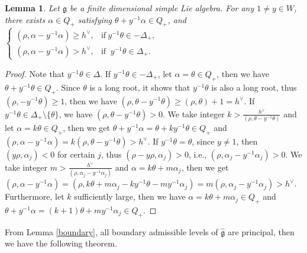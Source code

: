 \documentclass[12pt]{article}
\newtheorem{lem}[thm]{Lemma}
\begin{document}
\begin{lem}\label{lemy1}
Let $\mathfrak{g}$ be a finite dimensional simple Lie algebra. For any $1\ne y\in W$, there exists $\alpha\in Q_+$ satisfying $\theta+y^{-1}\alpha\in Q_+$,
and
$\begin{cases}
  (\rho,\alpha-y^{-1}\alpha)\geq h^\vee, & \text{if}~y^{-1}\theta\in -\Delta_+,\\
  (\rho,\alpha-y^{-1}\alpha)> h^\vee,  & \text{if }~y^{-1}\theta\in \Delta_+.
\end{cases}$
\end{lem}
\begin{proof}
Note that $y^{-1}\theta\in \Delta$.
If $y^{-1}\theta\in -\Delta_+$, let $\alpha=\theta\in Q_+$,
then we have $\theta+y^{-1}\theta\in Q_+$.
Since $\theta$ is a long root, it shows that $y^{-1}\theta$ is also a long root, thus $(\rho,-y^{-1}\theta)\geq1$, then we have
$(\rho,\theta-y^{-1}\theta)\geq(\rho,\theta)+1=h^\vee$.
If $y^{-1}\theta\in \Delta_+\setminus\{\theta\}$,
we have $(\rho,\theta-y^{-1}\theta)>0$.
We take integer $k>\frac{h^\vee}{(\rho,\theta-y^{-1}\theta)}$ and let $\alpha=k\theta\in Q_+$,
then we get $\theta+y^{-1}\alpha=\theta+ky^{-1}\theta\in Q_+$ and
$(\rho,\alpha-y^{-1}\alpha)=k(\rho,\theta-y^{-1}\theta)> h^\vee$.
If $y^{-1}\theta=\theta$, since $y\ne1$, then $(y\rho, \alpha_j)<0$ for certain $j$,
thus $(\rho-y\rho, \alpha_j)>0$, i.e., $(\rho,\alpha_j-y^{-1}\alpha_j)>0$.
We take integer $m>\frac{h^\vee}{(\rho,\alpha_j-y^{-1}\alpha_j)}$ and $\alpha=k\theta+m\alpha_j$,
then we get $(\rho,\alpha-y^{-1}\alpha)=(\rho,k\theta+m\alpha_j-ky^{-1}\theta-my^{-1}\alpha_j)=m(\rho,\alpha_j-y^{-1}\alpha_j)> h^\vee$.
Furthermore, let $k$ sufficiently large, then we have $\alpha=k\theta+m\alpha_j\in Q_+$ and
$\theta+y^{-1}\alpha=(k+1)\theta+my^{-1}\alpha_j\in Q_+$.
\end{proof}

From Lemma \ref{boundary}, all boundary admissible levels of $\widehat{\mathfrak{g}}$ are principal, then we have the following theorem.
\end{document}

